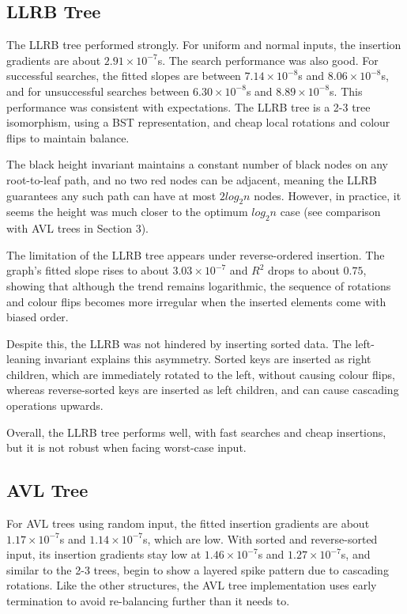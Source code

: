 \documentclass[12pt]{article}
\begin{document}
\vspace{-2em}
\subsection{LLRB Tree}
The LLRB tree performed strongly. For uniform and normal inputs, the insertion gradients are about $2.91 \times 10^{-7}$s. The search performance was also good. For successful searches, the fitted slopes are between $7.14 \times 10^{-8}$s and $8.06 \times 10^{-8}$s, and for unsuccessful searches between $6.30 \times 10^{-8}$s and $8.89 \times 10^{-8}$s.
This performance was consistent with expectations. The LLRB tree is a 2-3 tree isomorphism, using a BST representation, and cheap local rotations and colour flips to maintain balance. 

The black height invariant maintains a constant number of black nodes on any root-to-leaf path, and no two red nodes can be adjacent, meaning the LLRB guarantees any such path can have at most $2log_2n$ nodes. However, in practice, it seems the height was much closer to the optimum $log_2n$ case (see comparison with AVL trees in Section 3).

The limitation of the LLRB tree appears under reverse-ordered insertion. The graph's fitted slope rises to about $3.03 \times 10^{-7}$ and $R^2$ drops to about $0.75$, showing that although the trend remains logarithmic, the sequence of rotations and colour flips becomes more irregular when the inserted elements come with biased order.

Despite this, the LLRB was not hindered by inserting sorted data. The left-leaning invariant explains this asymmetry. Sorted keys are inserted as right children, which are immediately rotated to the left, without causing colour flips, whereas reverse-sorted keys are inserted as left children, and can cause cascading operations upwards.

Overall, the LLRB tree performs well, with fast searches and cheap insertions, but it is not robust when facing worst-case input.
\vspace{-1em}
\subsection{AVL Tree}
For AVL trees using random input, the fitted insertion gradients are about $1.17 \times 10^{-7}$s and $1.14 \times 10^{-7}$s, which are low. With sorted and reverse-sorted input, its insertion gradients stay low at $1.46 \times 10^{-7}$s and $1.27 \times 10^{-7}$s, and similar to the 2-3 trees, begin to show a layered spike pattern due to cascading rotations. Like the other structures, the AVL tree implementation uses early termination to avoid re-balancing further than it needs to.
\end{document}
